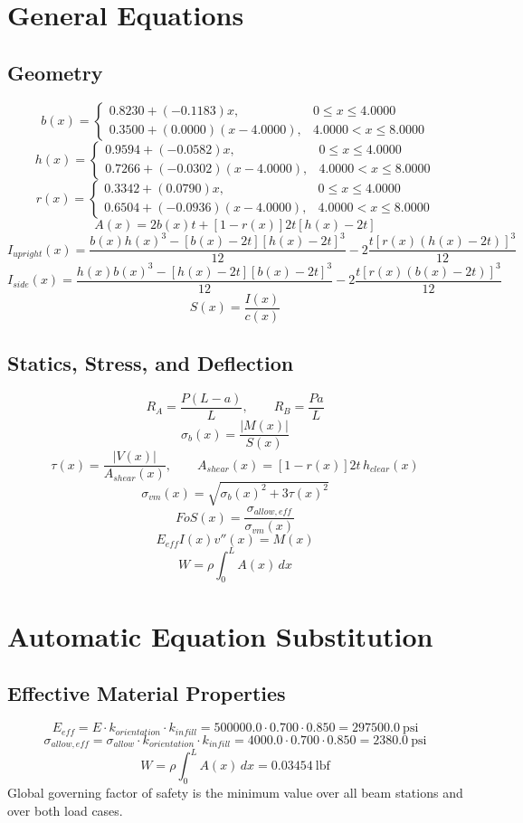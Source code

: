 \documentclass[11pt]{article}
\begin{document}
\section*{General Equations}
\subsection*{Geometry}
\[
b(x)=\begin{cases}0.8230 + (-0.1183)x, & 0 \le x \le 4.0000\\0.3500 + (0.0000)(x-4.0000), & 4.0000 < x \le 8.0000\end{cases}
\]
\[
h(x)=\begin{cases}0.9594 + (-0.0582)x, & 0 \le x \le 4.0000\\0.7266 + (-0.0302)(x-4.0000), & 4.0000 < x \le 8.0000\end{cases}
\]
\[
r(x)=\begin{cases}0.3342 + (0.0790)x, & 0 \le x \le 4.0000\\0.6504 + (-0.0936)(x-4.0000), & 4.0000 < x \le 8.0000\end{cases}
\]
\[
A(x)=2b(x)t+[1-r(x)]2t[h(x)-2t]
\]
\[
I_{upright}(x)=\frac{b(x)h(x)^3-[b(x)-2t][h(x)-2t]^3}{12}-2\frac{t[r(x)(h(x)-2t)]^3}{12}
\]
\[
I_{side}(x)=\frac{h(x)b(x)^3-[h(x)-2t][b(x)-2t]^3}{12}-2\frac{t[r(x)(b(x)-2t)]^3}{12}
\]
\[
S(x)=\frac{I(x)}{c(x)}
\]

\subsection*{Statics, Stress, and Deflection}
\[
R_A=\frac{P(L-a)}{L}, \qquad R_B=\frac{Pa}{L}
\]
\[
\sigma_b(x)=\frac{|M(x)|}{S(x)}
\]
\[
\tau(x)=\frac{|V(x)|}{A_{shear}(x)}, \qquad A_{shear}(x)=[1-r(x)]2t\,h_{clear}(x)
\]
\[
\sigma_{vm}(x)=\sqrt{\sigma_b(x)^2+3\tau(x)^2}
\]
\[
FoS(x)=\frac{\sigma_{allow,eff}}{\sigma_{vm}(x)}
\]
\[
E_{eff}I(x)v''(x)=M(x)
\]
\[
W=\rho\int_0^L A(x)\,dx
\]

\section*{Automatic Equation Substitution}
\subsection*{Effective Material Properties}
\[E_{eff} = E \cdot k_{orientation} \cdot k_{infill} = 500000.0 \cdot 0.700 \cdot 0.850 = 297500.0\ \mathrm{psi}\]
\[\sigma_{allow,eff} = \sigma_{allow} \cdot k_{orientation} \cdot k_{infill} = 4000.0 \cdot 0.700 \cdot 0.850 = 2380.0\ \mathrm{psi}\]
\[W = \rho \int_0^L A(x)\,dx = 0.03454\ \mathrm{lbf}\]
Global governing factor of safety is the minimum value over all beam stations and over both load cases.
\end{document}

